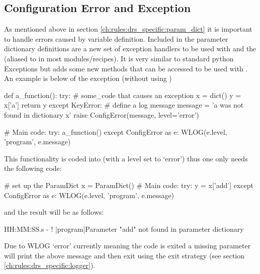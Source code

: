\subsection{Configuration Error and Exception}
\label{ch:rules:drs_specific:config_error}

As mentioned above in section \ref{ch:rules:drs_specific:param_dict} it is important to handle errors caused by variable definition. Included in the parameter dictionary definitions are a new set of exception handlers to be used with \ParamDict and the  (aliased to  in most modules/recipes). It is very similar to standard python Exceptions but adds some new methods that can be accessed to be used with . \\

An example is below of the  exception (without using \ParamDict)

\begin{pythonbox}
def a_function():
    try:
        # some_code that causes an exception
        x = dict()
        y = x['a']
        return y
    except KeyError:
        # define a log message
        message = 'a was not found in dictionary x'
        raise ConfigError(message, level='error')

# Main code:
try:
    a_function()
except ConfigError as e:
    WLOG(e.level, 'program', e.message)
\end{pythonbox}
\vspace{0.5cm}
\noindent This functionality is coded into \ParamDict (with a  level set to `error') thus one only needs the following code:
\begin{pythonbox}
# set up the ParamDict
x = ParamDict()
# Main code:
try:
    y = x['add']
except ConfigError as e:
    WLOG(e.level, 'program', e.message)
\end{pythonbox}
\noindent and the result will be as follows:
\begin{cmdboxprint}
HH:MM:SS.s - ! |program|Parameter "add" not found in parameter dictionary
\end{cmdboxprint}
\begin{note}
Due to WLOG `error' currently meaning the code is exited a missing parameter will print the above message and then exit using the  exit strategy (see section \ref{ch:rules:drs_specific:logger}).
\end{note}